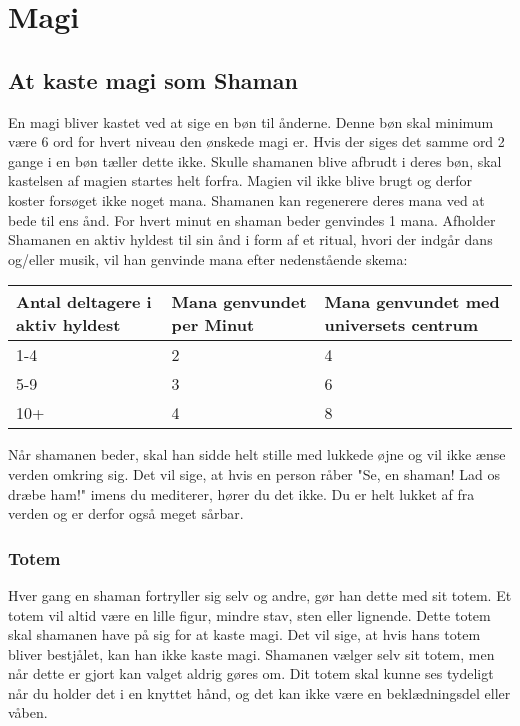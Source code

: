 \chapter*{Magi}
\section*{At kaste magi som Shaman}
En magi bliver kastet ved at sige en bøn til ånderne. Denne bøn skal minimum være 6 ord for hvert niveau den ønskede magi er. Hvis der siges det samme ord 2 gange i en bøn tæller dette ikke. Skulle shamanen blive afbrudt i deres bøn, skal kastelsen af magien startes helt forfra. Magien vil ikke blive brugt og derfor koster forsøget ikke noget mana. Shamanen kan regenerere deres mana ved at bede til ens ånd. For hvert minut en shaman beder genvindes 1 mana. Afholder Shamanen en aktiv hyldest til sin ånd i form af et ritual, hvori der indgår dans og/eller musik, vil han genvinde mana efter nedenstående skema:

\begin{table}[H]
    \centering
    \begin{tabular}{|p{}|p{}|p{}|}
    \rowcolor{cerulean!80}\hline
        Antal deltagere i aktiv hyldest & Mana genvundet per Minut & Mana genvundet med universets centrum \\\hline
        1-4&2&4\\\hline
        5-9&3&6\\\hline
        10+&4&8\\\hline
    \end{tabular}
\end{table}
Når shamanen beder, skal han sidde helt stille med lukkede øjne og vil ikke ænse verden omkring sig. Det vil sige, at hvis en person råber "Se, en shaman! Lad os dræbe ham!" imens du mediterer, hører du det ikke. Du er helt lukket af fra verden og er derfor også meget sårbar.

\subsection*{Totem}
Hver gang en shaman fortryller sig selv og andre, gør han dette med sit totem. Et totem vil altid være en lille figur, mindre stav, sten eller lignende. Dette totem skal shamanen have på sig for at kaste magi. Det vil sige, at hvis hans totem bliver bestjålet, kan han ikke kaste magi. Shamanen vælger selv sit totem, men når dette er gjort kan valget aldrig gøres om. Dit totem skal kunne ses tydeligt når du holder det i en knyttet hånd, og det kan ikke være en beklædningsdel eller våben.\\


